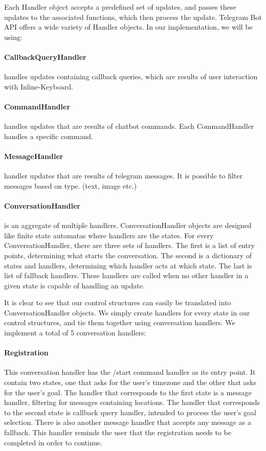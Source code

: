 Each Handler object accepts a predefined set of updates, and passes these updates to the associated functions, which then process the update.
Telegram Bot API offers a wide variety of Handler objects.
In our implementation, we will be using:

\paragraph{CallbackQueryHandler} handles updates containing callback queries, which are results of user interaction with Inline-Keyboard. 

\paragraph{CommandHandler} handles updates that are results of chatbot commands.
Each CommandHandler handles a specific command.

\paragraph{MessageHandler} handler updates that are results of telegram messages.
It is possible to filter messages based on type. (text, image etc.)

\paragraph{ConversationHandler} is an aggregate of multiple handlers. 
ConversationHandler objects are designed like finite state automatas where handlers are the states.
For every ConversationHandler, there are three sets of handlers.
The first is a list of entry points, determining what starts the conversation.
The second is a dictionary of states and handlers, determining which handler acts at which state.
The last is list of fallback handlers.
These handlers are called when no other handler in a given state is capable of handling an update.

It is clear to see that our control structures can easily be translated into ConversationHandler objects.
We simply create handlers for every state in our control structures, and tie them together using conversation handlers.
We implement a total of 5 conversation handlers:

\paragraph{Registration} This conversation handler has the /start command handler as its entry point. 
It contain two states, one that asks for the user's timezone and the other that asks for the user's goal.
The handler that corresponds to the first state is a message handler, filtering for messages containing locations.
The handler that corresponds to the second state is callback query handler, intended to process the user's goal selection.
There is also another message handler that accepts any message as a fallback.
This handler reminds the user that the registration needs to be completed in order to continue.

